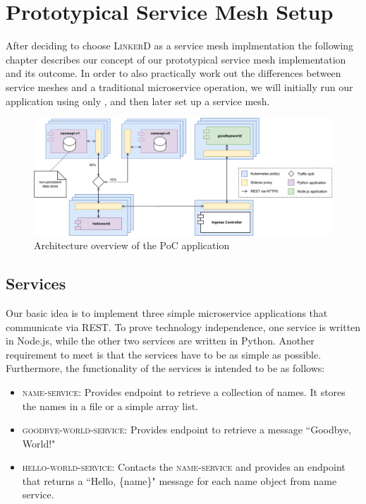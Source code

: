 \section{Prototypical Service Mesh Setup}

After deciding to choose \textsc{LinkerD} as a service mesh implmentation the following chapter describes our concept of our prototypical service mesh implementation and its outcome. In order to also practically work out the differences between service meshes and a traditional microservice operation, we will initially run our application using only \kubernetes{}, and then later set up a service mesh.

\begin{figure}
    \centering
    \includegraphics[width=\textwidth]{img/diagram-draft.pdf}
    \caption{Architecture overview of the PoC application}
    \label{fig:poc-overview}
\end{figure}

\subsection{Services}
\label{sec:services}

Our basic idea is to implement three simple microservice applications that communicate via REST. To prove technology independence, one service is written in Node.js, while the other two services are written in Python. Another requirement to meet is that the services have to be as simple as possible. Furthermore, the functionality of the services is intended to be as follows:

\begin{itemize}
\item \textsc{name-service}: Provides endpoint to retrieve a collection of names. It stores the names in a file or a simple array list.
\item \textsc{goodbye-world-service}: Provides endpoint to retrieve a message ``Goodbye, World!"
\item \textsc{hello-world-service}: Contacts the \textsc{name-service} and provides an endpoint that returns a ``Hello, \{name\}" message for each name object from name service.
\end{itemize}

